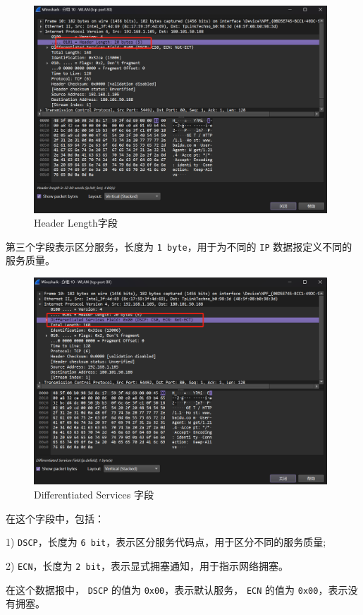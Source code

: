 \documentclass{article}
\begin{document}
	\begin{figure}[H]
		\centering
		\includegraphics[width=11cm]{images/6. Header Length字段.jpg}
		\caption{Header Length字段}
	\end{figure}
	
	第三个字段表示区分服务，长度为 \texttt{1 byte}，用于为不同的 \texttt{IP} 数据报定义不同的服务质量。
	
	\begin{figure}[H]
		\centering
		\includegraphics[width=11cm]{images/7. Differentiated Services 字段.jpg}
		\caption{Differentiated Services 字段}
	\end{figure}
	
	在这个字段中，包括：
	
	1) \texttt{DSCP}，长度为 \texttt{6 bit}，表示区分服务代码点，用于区分不同的服务质量; 
	
	2) \texttt{ECN}，长度为 \texttt{2 bit}，表示显式拥塞通知，用于指示网络拥塞。
	
	在这个数据报中， \texttt{DSCP} 的值为 \texttt{0x00}，表示默认服务， \texttt{ECN} 的值为 \texttt{0x00}，表示没有拥塞。
	
\end{document}
